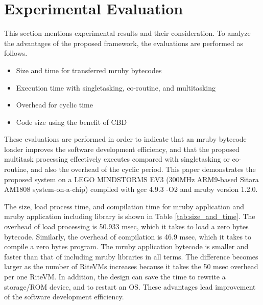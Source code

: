 \documentclass[a4j,12pt,oneside,openany,english]{jsbook}
\begin{document}
\chapter{Experimental Evaluation}
\label{sec:Evaluation}
This section mentions experimental results and their consideration.
To analyze the advantages of the proposed framework, the evaluations are performed as follows.
\begin{itemize}
    \item Size and time for transferred mruby bytecodes
    \item Execution time with singletasking, co-routine, and multitasking
    \item Overhead for cyclic time
    \item Code size using the benefit of CBD 
\end{itemize}

These evaluations are performed in order to indicate that an mruby bytecode loader improves the software development efficiency, and that the proposed multitask processing effectively executes compared with singletasking or co-routine, and also the overhead of the cyclic period.
This paper demonstrates the proposed system on a LEGO MINDSTORMS EV3 (300MHz ARM9-based Sitara AM1808 system-on-a-chip) compiled with gcc 4.9.3 -O2 and mruby version 1.2.0.

The size, load process time, and compilation time for mruby application and mruby application including library is shown in Table \ref{tab:size_and_time}.
The overhead of load processing is 50.933 msec, which it takes to load a zero bytes bytecode.
Similarly, the overhead of compilation is 46.9 msec, which it takes to compile a zero bytes program.
The mruby application bytecode is smaller and faster than that of including mruby libraries in all terms.
The difference becomes larger as the number of RiteVMs increases because it takes the 50 msec overhead per one RiteVM. 
In addition, the design can save the time to rewrite a storage/ROM device, and to restart an OS.
These advantages lead improvement of the software development efficiency.
\end{document}
